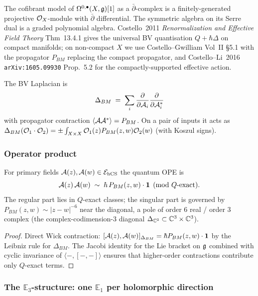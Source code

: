 \begin{proof-sketch}
The cofibrant model of $\Omega^{0,\bullet}(X,\mathfrak{g})[1]$ as a
$\bar\partial$-complex is a finitely-generated projective
$\mathcal{O}_X$-module with $\bar\partial$ differential. The symmetric algebra
on its Serre dual is a graded polynomial algebra. Costello~2011
\emph{Renormalization and Effective Field Theory} Thm~13.4.1 gives the
universal BV quantisation $Q + \hbar\Delta$ on compact manifolds; on
non-compact $X$ we use Costello--Gwilliam Vol~II §5.1 with the
propagator $P_{BM}$ replacing the compact propagator, and
Costello--Li~2016 \texttt{arXiv:1605.09930} Prop.~5.2 for the
compactly-supported effective action.

The BV Laplacian is
\[
  \Delta_{BM} \;=\; \sum_{i} \frac{\partial}{\partial\mathcal{A}_i}
  \frac{\partial}{\partial\mathcal{A}_i^*}
\]
with propagator contraction $\langle\mathcal{A}\mathcal{A}^*\rangle = P_{BM}$. On a pair
of inputs it acts as
$\Delta_{BM}(\mathcal{O}_1 \cdot \mathcal{O}_2) =
\pm\int_{X\times X} \mathcal{O}_1(z) P_{BM}(z,w) \mathcal{O}_2(w)$ (with Koszul signs).
\end{proof-sketch}

\subsubsection{Operator product}

\begin{theorem}\ClaimStatusTheorem
\label{opus13:thm:ope}
For primary fields $\mathcal{A}(z), \mathcal{A}(w) \in \mathcal{E}_{\mathrm{hCS}}$ the quantum OPE is
\[
  \mathcal{A}(z)\,\mathcal{A}(w) \;\sim\; \hbar\, P_{BM}(z,w)\cdot\mathbf{1}
  \pmod{Q\text{-exact}}.
\]
The regular part lies in $Q$-exact classes; the singular part is
governed by $P_{BM}(z,w) \sim |z-w|^{-6}$ near the diagonal, a pole of
order $6$ real / order $3$ complex (the complex-codimension-$3$ diagonal
$\Delta_{\mathbb{C}^3}\subset \mathbb{C}^3\times\mathbb{C}^3$).
\end{theorem}

\begin{proof}
Direct Wick contraction:
$[\mathcal{A}(z), \mathcal{A}(w)]_{\Delta_{BM}} = \hbar P_{BM}(z,w)\cdot \mathbf{1}$ by
the Leibniz rule for $\Delta_{BM}$. The Jacobi identity for the Lie
bracket on $\mathfrak{g}$ combined with cyclic invariance of
$\langle-,[-,-]\rangle$ ensures that higher-order contractions
contribute only $Q$-exact terms.
\end{proof}

\subsubsection{\texorpdfstring{The $\mathbb E_3$-structure: one $\mathbb E_1$ per holomorphic direction}{The E\_3-structure: one E\_1 per holomorphic direction}}

